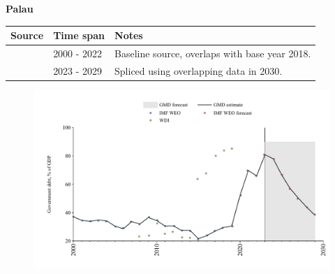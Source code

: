 \documentclass[12pt,a4paper,landscape]{article}
\begin{document}
\begin{adjustbox}{max totalsize={\paperwidth}{\paperheight},center}
\begin{minipage}[t][\textheight][t]{\textwidth}
\vspace*{0.5cm}
{}
\begin{center}
{\Large\bfseries Palau}
\end{center}
\vspace{0.5cm}
\begin{table}[H]
\centering
\small
\begin{tabular}{|l|l|l|}
\hline
\textbf{Source} & \textbf{Time span} & \textbf{Notes} \\
\hline
\rowcolor{white}\cite{IMF_WEO}& 2000 - 2022 &Baseline source, overlaps with base year 2018.\\
\rowcolor{lightgray}\cite{IMF_WEO_forecast}& 2023 - 2029 &Spliced using overlapping data in 2030.\\
\hline
\end{tabular}
\end{table}
\begin{figure}[H]
\centering
\includegraphics[width=\textwidth,height=0.6\textheight,keepaspectratio]{graphs/PLW_govdebt_GDP.pdf}
\end{figure}
\end{minipage}
\end{adjustbox}
\end{document}

